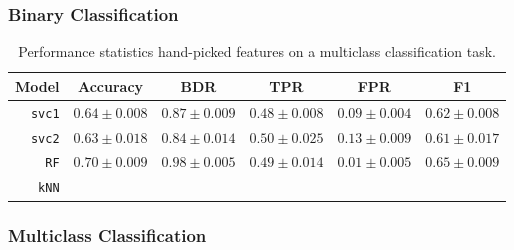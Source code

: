 \subsubsection{Binary Classification}




\begin{table}[ht]
  \centering
  \begin{tabular}{ r  r  r  r  r  r } \hline
    \multicolumn{1}{c}{\textbf{Model}} & \multicolumn{1}{c}{\textbf{Accuracy}} & \multicolumn{1}{c}{\textbf{BDR}} & \multicolumn{1}{c}{\textbf{TPR}} &
      \multicolumn{1}{c}{\textbf{FPR}} & \multicolumn{1}{c}{\textbf{F1}} \\ \hline

    \texttt{svc1} & $0.64 \pm 0.008$ & $0.87 \pm 0.009$ & $0.48 \pm 0.008$ & $0.09 \pm 0.004$ & $0.62 \pm 0.008$ \\

    \texttt{svc2} & $0.63 \pm 0.018$ & $0.84 \pm 0.014$ & $0.50 \pm 0.025$ & $0.13 \pm 0.009$ & $0.61 \pm 0.017$ \\

    \texttt{RF} & $0.70 \pm 0.009$ & $0.98 \pm 0.005$ & $0.49 \pm 0.014$ & $0.01 \pm 0.005$ & $0.65 \pm 0.009$ \\

    \texttt{kNN} & & & & & \\

    \hline
  \end{tabular}
  \caption{Performance statistics hand-picked features on a multiclass classification task.}
\end{table}

\subsubsection{Multiclass Classification}

